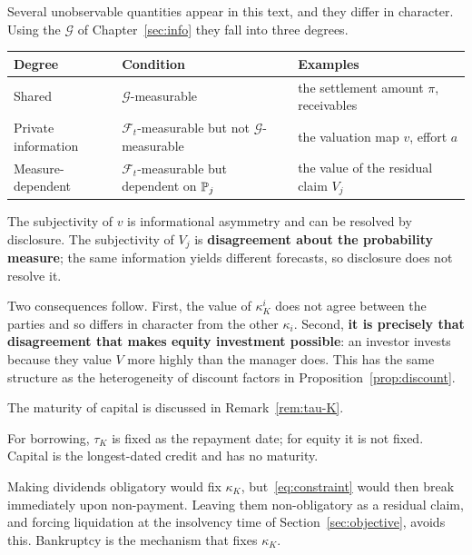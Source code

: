 \begin{remark}
\label{rem:subjectivity}
Several unobservable quantities appear in this text, and they differ in character. Using the
$\mathcal{G}$ of Chapter~\ref{sec:info} they fall into three degrees.

\begin{center}
\begin{tabularx}{\textwidth}{@{}llX@{}}
\toprule
Degree & Condition & Examples \\
\midrule
Shared & $\mathcal{G}$-measurable & the settlement amount $\pi$, receivables \\
Private information & $\mathcal{F}_t$-measurable but not $\mathcal{G}$-measurable & the valuation map $v$, effort $a$ \\
Measure-dependent & $\mathcal{F}_t$-measurable but dependent on $\mathbb{P}_j$ & the value of the residual claim $V_j$ \\
\bottomrule
\end{tabularx}
\label{tab:subjectivity-levels}
\end{center}

The subjectivity of $v$ is informational asymmetry and can be resolved by disclosure.
The subjectivity of $V_j$ is \textbf{disagreement about the probability measure}; the same
information yields different forecasts, so disclosure does not resolve it.

Two consequences follow. First, the value of $\kappa_K^{i}$ does not agree between the
parties and so differs in character from the other $\kappa_i$. Second,
\textbf{it is precisely that disagreement that makes equity investment possible}: an
investor invests because they value $V$ more highly than the manager does. This has the same
structure as the heterogeneity of discount factors in Proposition~\ref{prop:discount}.
\end{remark}

The maturity of capital is discussed in Remark~\ref{rem:tau-K}.

\begin{remark}
\label{rem:tau-K}
For borrowing, $\tau_K$ is fixed as the repayment date; for equity it is not fixed. Capital
is the longest-dated credit and has no maturity.

Making dividends obligatory would fix $\kappa_K$, but~\eqref{eq:constraint} would then break
immediately upon non-payment. Leaving them non-obligatory as a residual claim, and forcing
liquidation at the insolvency time of Section~\ref{sec:objective}, avoids this.
Bankruptcy is the mechanism that fixes $\kappa_K$.
\end{remark}

